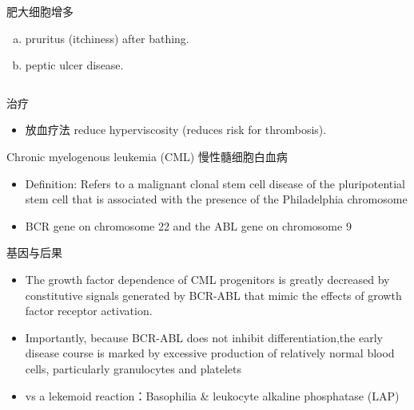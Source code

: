 \documentclass[
  ignorenonframetext,
]{beamer}
\providecommand{\tightlist}{%
  \setlength{\itemsep}{0pt}\setlength{\parskip}{0pt}}
\begin{document}
\begin{frame}
\begin{columns}[T]
\begin{column}{0.3\textwidth}
\begin{block}{肥大细胞增多}
\begin{itemize}
  \begin{enumerate}
  [(a)]
  \item
    pruritus (itchiness) after bathing.
  \item
    peptic ulcer disease.
  \end{enumerate}
\end{itemize}
\end{block}
\end{column}
\end{columns}
\end{frame}

\begin{frame}
\begin{block}{治疗}
\protect\hypertarget{ux6cbbux7597-1}{}
\begin{itemize}
\tightlist
\item
  放血疗法 reduce hyperviscosity (reduces risk for thrombosis).
\end{itemize}
\end{block}
\end{frame}

\begin{frame}
\begin{block}{Chronic myelogenous leukemia (CML) 慢性髓细胞白血病}
\protect\hypertarget{chronic-myelogenous-leukemia-cml-ux6162ux6027ux9ad3ux7ec6ux80deux767dux8840ux75c5}{}
\begin{itemize}
\item
  Definition: Refers to a malignant clonal stem cell disease of the
  pluripotential stem cell that is associated with the presence of the
  Philadelphia chromosome
\item
  BCR gene on chromosome 22 and the ABL gene on chromosome 9
\end{itemize}
\end{block}
\end{frame}

\begin{frame}
\begin{block}{基因与后果}
\protect\hypertarget{ux57faux56e0ux4e0eux540eux679c-1}{}
\begin{itemize}
\item
  The growth factor dependence of CML progenitors is greatly decreased
  by constitutive signals generated by BCR-ABL that mimic the effects of
  growth factor receptor activation.
\item
  Importantly, because BCR-ABL does not inhibit differentiation,the
  early disease course is marked by excessive production of relatively
  normal blood cells, particularly granulocytes and platelets
\item
  vs a lekemoid reaction：Basophilia \& leukocyte alkaline phosphatase
  (LAP)
\end{itemize}
\end{block}
\end{frame}
\end{document}
